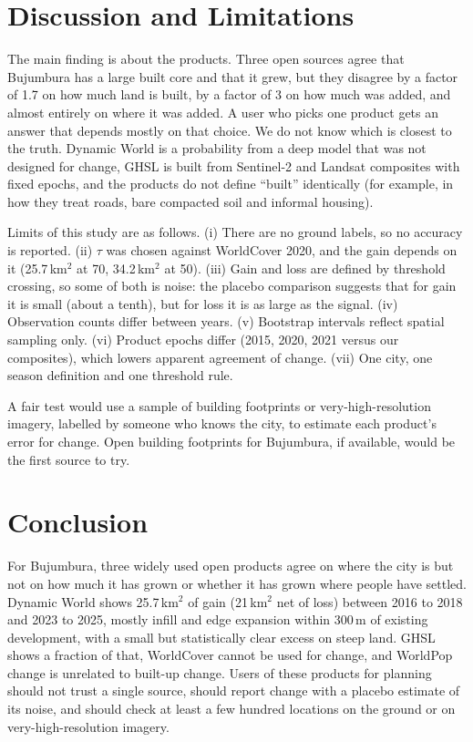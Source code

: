 \documentclass[conference]{IEEEtran}
\begin{document}
\section{Discussion and Limitations}

The main finding is about the products. Three open sources agree that Bujumbura has a large built core and that it grew, but they disagree by a factor of 1.7 on how much land is built, by a factor of 3 on how much was added, and almost entirely on where it was added. A user who picks one product gets an answer that depends mostly on that choice. We do not know which is closest to the truth. Dynamic World is a probability from a deep model that was not designed for change, GHSL is built from Sentinel-2 and Landsat composites with fixed epochs, and the products do not define ``built'' identically (for example, in how they treat roads, bare compacted soil and informal housing).

Limits of this study are as follows. (i) There are no ground labels, so no accuracy is reported. (ii) $\tau$ was chosen against WorldCover 2020, and the gain depends on it (25.7\,km$^2$ at 70, 34.2\,km$^2$ at 50). (iii) Gain and loss are defined by threshold crossing, so some of both is noise: the placebo comparison suggests that for gain it is small (about a tenth), but for loss it is as large as the signal. (iv) Observation counts differ between years. (v) Bootstrap intervals reflect spatial sampling only. (vi) Product epochs differ (2015, 2020, 2021 versus our composites), which lowers apparent agreement of change. (vii) One city, one season definition and one threshold rule.

A fair test would use a sample of building footprints or very-high-resolution imagery, labelled by someone who knows the city, to estimate each product's error for change. Open building footprints for Bujumbura, if available, would be the first source to try.

\section{Conclusion}

For Bujumbura, three widely used open products agree on where the city is but not on how much it has grown or whether it has grown where people have settled. Dynamic World shows 25.7\,km$^2$ of gain (21\,km$^2$ net of loss) between 2016 to 2018 and 2023 to 2025, mostly infill and edge expansion within 300\,m of existing development, with a small but statistically clear excess on steep land. GHSL shows a fraction of that, WorldCover cannot be used for change, and WorldPop change is unrelated to built-up change. Users of these products for planning should not trust a single source, should report change with a placebo estimate of its noise, and should check at least a few hundred locations on the ground or on very-high-resolution imagery.



\end{document}
